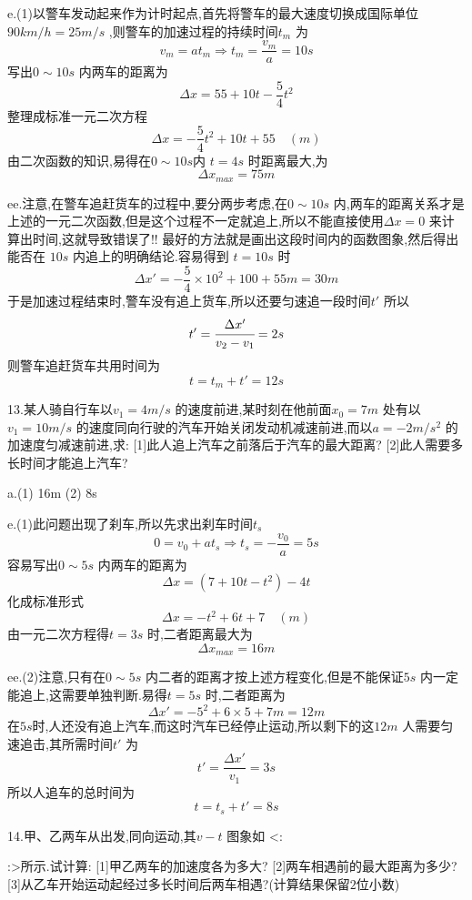 \begin{calculate}
e.(1)以警车发动起来作为计时起点,首先将警车的最大速度切换成国际单位 $90km/h=25m/s$ ,则警车的加速过程的持续时间$t_m$ 为
$$v_m=at_m \Longrightarrow t_m=\frac{v_m}{a}=10s$$
写出$0\sim 10s$ 内两车的距离为
$$\Delta x=55+10t -\frac{5}{4}t^2$$
整理成标准一元二次方程
$$\Delta x =-\frac{5}{4}t^2+10t+55 \quad (m)$$
由二次函数的知识,易得在$0\sim 10s$内 $t=4s$ 时距离最大,为
$$\Delta x_{max}=75m$$

ee.注意,在警车追赶货车的过程中,要分两步考虑,在$0\sim 10s$ 内,两车的距离关系才是上述的一元二次函数,但是这个过程不一定就追上,所以不能直接使用$\Delta x=0$ 来计算出时间,这就导致错误了!! 最好的方法就是画出这段时间内的函数图象,然后得出能否在 $10s$ 内追上的明确结论.容易得到 $t=10s$ 时
$$\Delta x'=-\frac{5}{4}\times 10^2 +100 +55m =30m$$
于是加速过程结束时,警车没有追上货车,所以还要匀速追一段时间$t'$ 所以
$$t'=\cfrac{\Delta x'}{v_2-v_1}=2s$$
则警车追赶货车共用时间为
$$t=t_m+t'=12s$$

13.某人骑自行车以$v_1=4m/s$ 的速度前进,某时刻在他前面$x_0=7m$ 处有以$v_1=10m/s$ 的速度同向行驶的汽车开始关闭发动机减速前进,而以$a=-2m/s^2$ 的加速度匀减速前进,求:
[1]此人追上汽车之前落后于汽车的最大距离?
[2]此人需要多长时间才能追上汽车?

a.(1) 16m \qquad (2) 8s

e.(1)此问题出现了刹车,所以先求出刹车时间$t_s$
$$0=v_0+at_s \Longrightarrow t_s=-\frac{v_0}{a}=5s$$
容易写出$0\sim 5s$ 内两车的距离为
$$\Delta x = (7+10t-t^2)-4t $$
化成标准形式
$$\Delta x=-t^2+6t+7 \quad (m)$$
由一元二次方程得$t=3s$ 时,二者距离最大为
$$\Delta x_{max}=16m$$

ee.(2)注意,只有在$0\sim 5s$ 内二者的距离才按上述方程变化,但是不能保证$5s$ 内一定能追上,这需要单独判断.易得$t=5s$ 时,二者距离为
$$\Delta x'=-5^2+6\times 5 +7 m =12m$$
在$5s$时,人还没有追上汽车,而这时汽车已经停止运动,所以剩下的这$12m$ 人需要匀速追击,其所需时间$t'$ 为
$$t'=\frac{\Delta x'}{v_1}=3s$$
所以人追车的总时间为
$$t=t_s+t'=8s$$


14.甲、乙两车从出发,同向运动,其$v-t$ 图象如
<:
:>所示.试计算:
[1]甲乙两车的加速度各为多大?
[2]两车相遇前的最大距离为多少?
[3]从乙车开始运动起经过多长时间后两车相遇?(计算结果保留$2$位小数)


\end{calculate}
